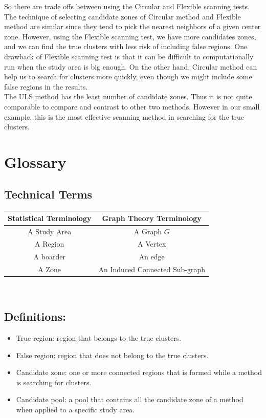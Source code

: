 \documentclass[12pt]{article}
\begin{document}
So there are trade offs between using the Circular and Flexible scanning tests. The technique of selecting candidate zones of Circular method and Flexible method are similar since they tend to pick the nearest neighbors of a given center zone. However, using the Flexible scanning test, we have more candidates zones, and we can find the true clusters with less risk of including false regions. One drawback of Flexible scanning test is that it can be difficult to computationally run when the study area is big enough. On the other hand, Circular method can help us to search for clusters more quickly, even though we might include some false regions in the results. \\
   
The ULS method has the least number of candidate zones. Thus it is not quite comparable to compare and contrast to other two methods. However in our small example, this is the most effective scanning method in searching for the true clusters. \\



\section{Glossary}
\subsection{Technical Terms}
\begin{tabular}{|c|c|}
\hline
\textbf{Statistical Terminology }& \textbf{Graph Theory Terminology} \\
\hline
A Study Area & A Graph $G$ \\
A Region & A Vertex \\
A boarder & An edge \\
A Zone & An Induced Connected Sub-graph\\

\hline

\end{tabular} \\

 	
\subsection{Definitions:} 
\begin{itemize}
\item True region:  region that belongs to the true clusters. \\ 
\item False region:  region that does not belong to the true clusters. \\ 
\item Candidate zone:  one or more connected regions that is formed while a method is searching for clusters.\\ 
\item Candidate pool:  a pool that contains all the candidate zone of a method when applied to a specific study area. \\
\end{itemize}
\end{document}
